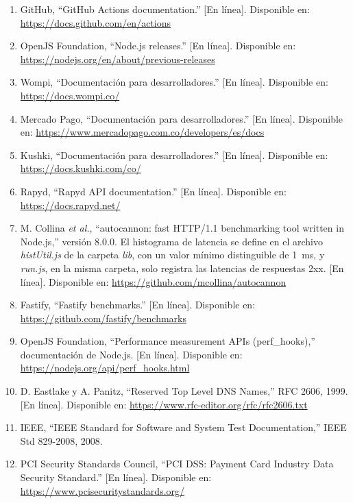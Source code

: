 \begin{enumerate}
  \item GitHub, ``GitHub Actions documentation.'' [En línea]. Disponible en: \url{https://docs.github.com/en/actions}

  \item OpenJS Foundation, ``Node.js releases.'' [En línea]. Disponible en: \url{https://nodejs.org/en/about/previous-releases}

  \item Wompi, ``Documentación para desarrolladores.'' [En línea]. Disponible en: \url{https://docs.wompi.co/}

  \item Mercado Pago, ``Documentación para desarrolladores.'' [En línea]. Disponible en: \url{https://www.mercadopago.com.co/developers/es/docs}

  \item Kushki, ``Documentación para desarrolladores.'' [En línea]. Disponible en: \url{https://docs.kushki.com/co/}

  \item Rapyd, ``Rapyd API documentation.'' [En línea]. Disponible en: \url{https://docs.rapyd.net/}

  \item M. Collina \emph{et al.}, ``autocannon: fast HTTP/1.1 benchmarking tool written in Node.js,'' versión 8.0.0. El histograma de latencia se define en el archivo \emph{histUtil.js} de la carpeta \emph{lib}, con un valor mínimo distinguible de 1~ms, y \emph{run.js}, en la misma carpeta, solo registra las latencias de respuestas 2xx. [En línea]. Disponible en: \url{https://github.com/mcollina/autocannon}\label{ref:autocannon}

  \item Fastify, ``Fastify benchmarks.'' [En línea]. Disponible en: \url{https://github.com/fastify/benchmarks}\label{ref:fastify-benchmarks}

  \item OpenJS Foundation, ``Performance measurement APIs (perf\_hooks),'' documentación de Node.js. [En línea]. Disponible en: \url{https://nodejs.org/api/perf_hooks.html}\label{ref:node-perf-hooks}

  \item D. Eastlake y A. Panitz, ``Reserved Top Level DNS Names,'' RFC 2606, 1999. [En línea]. Disponible en: \url{https://www.rfc-editor.org/rfc/rfc2606.txt}\label{ref:rfc2606}

  \item IEEE, ``IEEE Standard for Software and System Test Documentation,'' IEEE Std 829-2008, 2008.

  \item PCI Security Standards Council, ``PCI DSS: Payment Card Industry Data Security Standard.'' [En línea]. Disponible en: \url{https://www.pcisecuritystandards.org/}
\end{enumerate}
\endgroup

